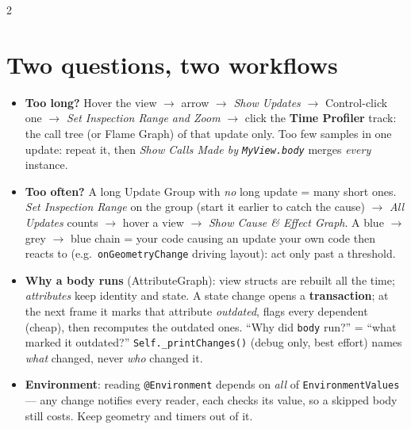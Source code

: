 \documentclass[8pt]{extarticle}
\begin{document}
\begin{multicols}{2}
\section{Two questions, two workflows}
\begin{itemize}
  \item \textbf{Too long?} Hover the view $\to$ arrow $\to$ \emph{Show Updates} $\to$ Control-click
        one $\to$ \emph{Set Inspection Range and Zoom} $\to$ click the \textbf{Time Profiler}
        track: the call tree (or Flame Graph) of that update only.
        Too few samples in one update: repeat it, then \emph{Show Calls Made by
        \texttt{MyView.body}} merges \emph{every} instance.
  \item \textbf{Too often?} A long Update Group with \emph{no} long update = many short ones.
        \emph{Set Inspection Range} on the group (start it earlier to catch the cause) $\to$
        \emph{All Updates} counts $\to$ hover a view $\to$ \emph{Show Cause \& Effect Graph}.
        A blue $\to$ grey $\to$ blue chain = your code causing an update your own code then
        reacts to (e.g.\ \texttt{onGeometryChange} driving layout): act only past a threshold.
  \item \textbf{Why a body runs} (AttributeGraph): view structs are rebuilt all the time;
        \emph{attributes} keep identity and state. A state change opens a
        \textbf{transaction}; at the next frame it marks that attribute \emph{outdated}, flags
        every dependent (cheap), then recomputes the outdated ones. ``Why did \texttt{body}
        run?'' = ``what marked it outdated?'' \texttt{Self.\_printChanges()} (debug only, best
        effort) names \emph{what} changed, never \emph{who} changed it.
  \item \textbf{Environment}: reading \texttt{@Environment} depends on \emph{all} of
        \texttt{EnvironmentValues} — any change notifies every reader, each checks its value, so a
        skipped body still costs. Keep geometry and timers out of it.
\end{itemize}

\columnbreak


\end{multicols}
\end{document}
